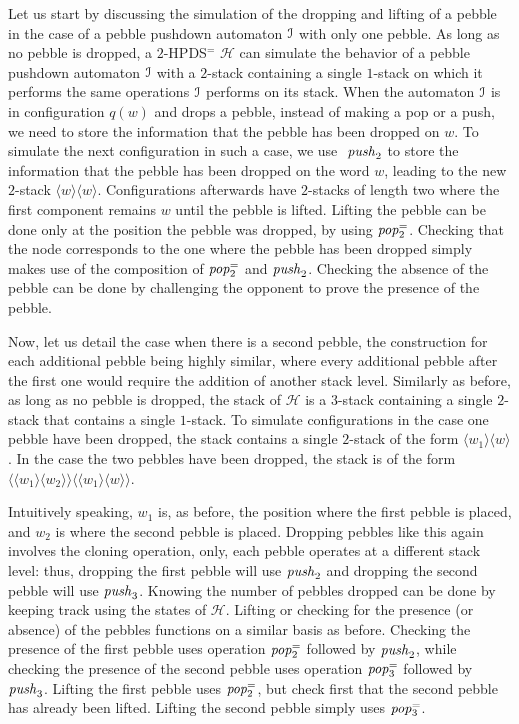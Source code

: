 \documentclass[a4paper,UKenglish,cleveref, autoref, thm-restate]{lipics-v2021}
\renewcommand{\H}{\mathcal{H}}
\begin{document}
Let us start by discussing the simulation of the dropping and lifting of a pebble in the case of
a pebble pushdown automaton $\mathcal{I}$ with only one pebble.
As long as no pebble is dropped, a $2$-HPDS$^=$ $\H$ can simulate 
the behavior of a pebble pushdown automaton $\mathcal{I}$ with a $2$-stack containing a single $1$-stack
on which it performs the same operations $\mathcal{I}$ performs on its stack.
When the automaton $\mathcal{I}$ is in configuration $q(w)$ and drops a pebble, instead of making a pop or a push, we need
to
	store the information that the pebble has been
dropped on $w$.
To simulate the next configuration in such a case, we use 
$\text{\textit{ push}}_2$
to store the information that the pebble has been dropped on the word $w$, leading to the new  $2$-stack
$\langle w \rangle \langle w \rangle$. 
Configurations afterwards have $2$-stacks of length two where the first component remains
$w$ until the pebble is lifted.
Lifting the pebble can be done only at the position the
pebble was dropped, by using $\text{\textit{pop}}^=_2$.
Checking that the node
corresponds to the one where the pebble has been dropped simply makes use of
the composition of $\text{\textit{pop}}^=_2$ and $\text{\textit{push}}_2$.
Checking the absence of the pebble can be done by challenging
the opponent to prove the presence of the pebble.

Now, let us detail the case when there is a second pebble, the construction
for each additional pebble being highly similar, where every additional pebble after
the first one would require the addition of another stack level.
Similarly as before, 
as long as no pebble is dropped, the stack of $\H$ 
is a $3$-stack containing a
single $2$-stack that contains a single $1$-stack.
To simulate configurations in the case one pebble have been dropped, the stack contains a single
 $2$-stack of the form $\langle w_1 \rangle \langle w \rangle$.
In the case the two pebbles have been dropped, 
the stack is of the form $ \langle \langle w_1 \rangle \langle w_2 \rangle \rangle
\langle \langle w_1 \rangle \langle w \rangle \rangle$. 



Intuitively speaking, $w_1$ is, as before, the position where the first pebble is
placed, and $w_2$ is where the second pebble is placed. Dropping pebbles like this
again involves the cloning operation, only, each pebble operates at a different 
stack level: thus, dropping the first pebble will use $\text{\textit{push}}_2$
and dropping the second pebble will use $\text{\textit{push}}_3$. Knowing the number of pebbles dropped can be done by 
keeping track using the states of $\H$.
Lifting or
checking for the presence 
(or absence) 
of the pebbles functions on a similar
basis as before. Checking the presence of the first pebble uses 
operation $\text{\textit{pop}}^=_2$ followed by $\text{\textit{push}}_2$,
while checking the presence of the second pebble uses 
operation $\text{\textit{pop}}^=_3$ followed by $\text{\textit{push}}_3$.
Lifting the first pebble uses $\text{\textit{pop}}^=_2$, but
check first that the second pebble has already been lifted.
Lifting the second pebble simply uses $\text{\textit{pop}}^=_3$.
\end{document}
